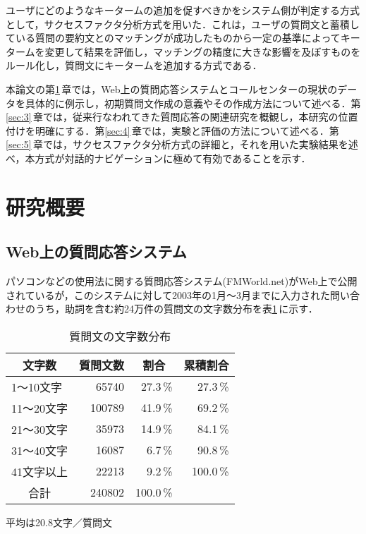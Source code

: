 ユーザにどのようなキータームの追加を促すべきかをシステム側が判定する方式として，サクセスファクタ分析方式を用いた．これは，ユーザの質問文と蓄積している質問の要約文とのマッチングが成功したものから一定の基準によってキータームを変更して結果を評価し，マッチングの精度に大きな影響を及ぼすものをルール化し，質問文にキータームを追加する方式である．

本論文の第\ref{sec:2}\,章では，Web上の質問応答システムとコールセンターの現状のデータを具体的に例示し，初期質問文作成の意義やその作成方法について述べる．第\ref{sec:3}\,章では，従来行なわれてきた質問応答の関連研究を概観し，本研究の位置付けを明確にする．第\ref{sec:4}\,章では，実験と評価の方法について述べる．第\ref{sec:5}\,章では，サクセスファクタ分析方式の詳細と，それを用いた実験結果を述べ，本方式が対話的ナビゲーションに極めて有効であることを示す．

\section{研究概要}\label{sec:2}
\subsection{Web上の質問応答システム}
パソコンなどの使用法に関する質問応答システム(FMWorld.net)がWeb上で公開されているが，このシステムに対して2003年の1月〜3月までに入力された問い合わせのうち，助詞を含む約24万件の質問文の文字数分布を表\ref{tab:sbunpu}\,に示す． 

\begin{table}[ht]
\caption{質問文の文字数分布}
\label{tab:sbunpu}
\begin{center}
  \begin{tabular}{|l|r|r|r|} \hline
   \multicolumn{1}{|c|}{文字数} & \multicolumn{1}{|c|}{質問文数} & \multicolumn{1}{|c|}{割合} & \multicolumn{1}{|c|}{累積割合} \\ \hline\hline
   1〜10文字 & 65740 & 27.3\,\% & 27.3\,\% \\ \hline
   11〜20文字 & 100789 & 41.9\,\% & 69.2\,\% \\ \hline
   21〜30文字 & 35973 & 14.9\,\% & 84.1\,\% \\ \hline
   31〜40文字 & 16087 &  6.7\,\% & 90.8\,\% \\ \hline
   41文字以上 & 22213 & 9.2\,\% & 100.0\,\% \\ \hline
   \multicolumn{1}{|c|}{合計} & 240802 & 100.0\,\% & \\ \hline
  \end{tabular}

平均は20.8文字／質問文
\end{center}
\end{table}

